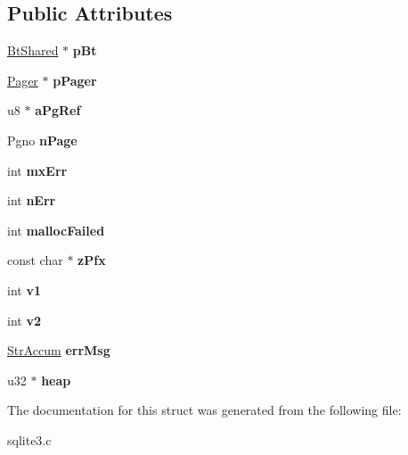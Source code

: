\subsection*{Public Attributes}
\begin{DoxyCompactItemize}
\item 
\hyperlink{structBtShared}{Bt\+Shared} $\ast$ {\bfseries p\+Bt}\hypertarget{structIntegrityCk_a65f03f54514f504bd871bb2ccd3da188}{}\label{structIntegrityCk_a65f03f54514f504bd871bb2ccd3da188}

\item 
\hyperlink{structPager}{Pager} $\ast$ {\bfseries p\+Pager}\hypertarget{structIntegrityCk_a87e7f8b012b61b61fae359269cbacce4}{}\label{structIntegrityCk_a87e7f8b012b61b61fae359269cbacce4}

\item 
u8 $\ast$ {\bfseries a\+Pg\+Ref}\hypertarget{structIntegrityCk_a317f80aef5842ad69df75b55e14118d1}{}\label{structIntegrityCk_a317f80aef5842ad69df75b55e14118d1}

\item 
Pgno {\bfseries n\+Page}\hypertarget{structIntegrityCk_a04f496ef7239aea6dccb6a861bb5a798}{}\label{structIntegrityCk_a04f496ef7239aea6dccb6a861bb5a798}

\item 
int {\bfseries mx\+Err}\hypertarget{structIntegrityCk_a9daa97cdcb1366c503451ab2af9e7ba6}{}\label{structIntegrityCk_a9daa97cdcb1366c503451ab2af9e7ba6}

\item 
int {\bfseries n\+Err}\hypertarget{structIntegrityCk_a52c815a1d19be87d0ab4dc0a4e4d38e2}{}\label{structIntegrityCk_a52c815a1d19be87d0ab4dc0a4e4d38e2}

\item 
int {\bfseries malloc\+Failed}\hypertarget{structIntegrityCk_a8e448c1d6483a0326a7ec39291782030}{}\label{structIntegrityCk_a8e448c1d6483a0326a7ec39291782030}

\item 
const char $\ast$ {\bfseries z\+Pfx}\hypertarget{structIntegrityCk_a126e42d437777815b1c1d74bcacb3b38}{}\label{structIntegrityCk_a126e42d437777815b1c1d74bcacb3b38}

\item 
int {\bfseries v1}\hypertarget{structIntegrityCk_a94edb493175bd0c1862efbaeaff63be3}{}\label{structIntegrityCk_a94edb493175bd0c1862efbaeaff63be3}

\item 
int {\bfseries v2}\hypertarget{structIntegrityCk_a0dd13b39fb4fd4e42de8ebf05af5c287}{}\label{structIntegrityCk_a0dd13b39fb4fd4e42de8ebf05af5c287}

\item 
\hyperlink{structStrAccum}{Str\+Accum} {\bfseries err\+Msg}\hypertarget{structIntegrityCk_a1e9b79bb1d7b22a840001333200a950e}{}\label{structIntegrityCk_a1e9b79bb1d7b22a840001333200a950e}

\item 
u32 $\ast$ {\bfseries heap}\hypertarget{structIntegrityCk_aada31529ac9fd90643f22cbb79cd916a}{}\label{structIntegrityCk_aada31529ac9fd90643f22cbb79cd916a}

\end{DoxyCompactItemize}


The documentation for this struct was generated from the following file\+:\begin{DoxyCompactItemize}
\item 
sqlite3.\+c\end{DoxyCompactItemize}
